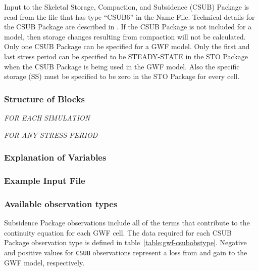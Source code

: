 Input to the Skeletal Storage, Compaction, and Subsidence (CSUB) Package is read from the file that has type ``CSUB6'' in the Name File.  Technical details for the CSUB Package are described in \cite{modflow6csub}.  If the CSUB Package is not included for a model, then storage changes resulting from compaction will not be calculated.  Only one CSUB Package can be specified for a GWF model. Only the first and last stress period can be specified to be STEADY-STATE in the STO Package when the CSUB Package is being used in the GWF model. Also the specific storage (SS) must be specified to be zero in the STO Package for every cell.

\vspace{5mm}
\subsubsection{Structure of Blocks}

\vspace{5mm}
\noindent \textit{FOR EACH SIMULATION}




\vspace{5mm}
\noindent \textit{FOR ANY STRESS PERIOD}

\packageperioddescription

\vspace{5mm}
\subsubsection{Explanation of Variables}
\begin{description}

\end{description}

\vspace{5mm}
\subsubsection{Example Input File}



\vspace{5mm}
\subsubsection{Available observation types}
Subsidence Package observations include all of the terms that contribute to the continuity equation for each GWF cell. The data required for each CSUB Package observation type is defined in table~\ref{table:gwf-csubobstype}. Negative and positive values for \texttt{CSUB} observations represent a loss from and gain to the GWF model, respectively.


